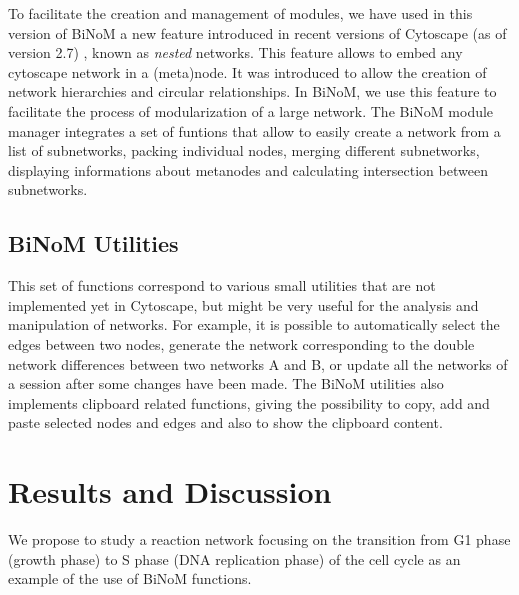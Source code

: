 \documentclass[10pt]{bmc_article}
\newenvironment{bmcformat}{\baselineskip20pt\sloppy\setboolean{publ}{false}}{\baselineskip20pt\sloppy}
\begin{document}
\begin{bmcformat}
To facilitate the creation and management of modules, we have used in this
version of BiNoM a new feature introduced in recent versions of Cytoscape (as of
version 2.7) \cite{cline2007integration}, known as \emph{nested} networks. This
feature allows to embed any cytoscape network in a (meta)node. It was
introduced to allow the creation of network hierarchies and circular
relationships. In BiNoM, we use this feature to facilitate the process of
modularization of a large network. The BiNoM module manager integrates a set of
funtions that allow to easily create a network from a list of subnetworks,
packing individual nodes, merging different subnetworks, displaying informations
about metanodes and calculating intersection between subnetworks.

\subsection*{BiNoM Utilities}
This set of functions correspond to various small utilities that are not
implemented yet in Cytoscape, but might be very useful for the analysis and
manipulation of networks. For example, it is possible to automatically select
the edges between two nodes, generate the network corresponding to the double
network differences between two networks A and B, or update all the networks of
a session after some changes have been made. The BiNoM utilities also implements
clipboard related functions, giving the possibility to copy, add and paste
selected nodes and edges and also to show the clipboard content. 


\section*{Results and Discussion}
We propose to study a reaction network focusing on the transition from G1 phase
(growth phase) to S phase (DNA replication phase) of the cell cycle
\cite{calzone2008comprehensive} as an example of the use of BiNoM functions. 


\end{bmcformat}
\end{document}
